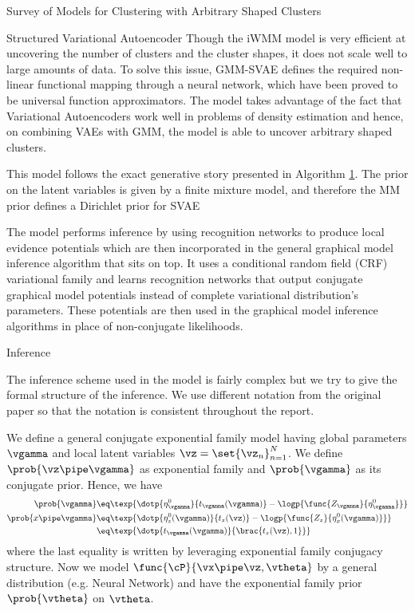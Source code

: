 \documentclass{article}
\begin{document}
\begin{psection}{Survey of Models for Clustering with Arbitrary Shaped Clusters}
	\begin{psubsection}{Structured Variational Autoencoder}
		Though the iWMM model is very efficient at uncovering the number of clusters and the cluster shapes, it does not scale well to large amounts of data. To solve this issue, GMM-SVAE \citep{svae} defines the required non-linear functional mapping through a neural network, which have been proved to be universal function approximators. The model takes advantage of the fact that Variational Autoencoders work well in problems of density estimation and hence, on combining VAEs with GMM, the model is able to uncover arbitrary shaped clusters.

		This model follows the exact generative story presented in Algorithm \hyperlink{algo:1}{1}. The prior on the latent variables is given by a finite mixture model, and therefore the MM prior defines a Dirichlet prior for SVAE

		The model performs inference by using recognition networks to produce local evidence potentials which are then incorporated in the general graphical model inference algorithm that sits on top. It uses a conditional random field (CRF) variational family and learns recognition networks that output conjugate graphical model potentials instead of complete variational distribution's parameters. These potentials are then used in the graphical model inference algorithms in place of non-conjugate likelihoods.

		\begin{pssubsection}{Inference}

			The inference scheme used in the model is fairly complex but we try to give the formal structure of the inference. We use different notation from the original paper so that the notation is consistent throughout the report.

			We define a general conjugate exponential family model having global parameters $\vgamma$ and local latent variables $\vz = \set{\vz_n}_{n = 1}^N$. We define $\prob{\vz \pipe \vgamma}$ as exponential family and $\prob{\vgamma}$ as its conjugate prior. Hence, we have
			\begin{align*}
				\prob{\vgamma}			&\eq	\texp{\dotp{\eta_{\vgamma}^0}{t_\vgamma(\vgamma)} - \logp{\func{Z_\vgamma}{\eta_{\vgamma}^0}}} \\
				\prob{x \pipe \vgamma}	&\eq	\texp{\dotp{\eta_z^0(\vgamma)}{t_z(\vz)} - \logp{\func{Z_z}{\eta_x^0(\vgamma)}}} \\
				&\eq \texp{\dotp{t_\vgamma(\vgamma)}{\brac{t_z(\vz), 1}}}
			\end{align*}
			where the last equality is written by leveraging exponential family conjugacy structure. Now we model $\func{\cP}{\vx \pipe \vz, \vtheta}$ by a general distribution (e.g. Neural Network) and have the exponential family prior $\prob{\vtheta}$ on $\vtheta$.


\end{pssubsection}
\end{psubsection}
\end{psection}
\end{document}
